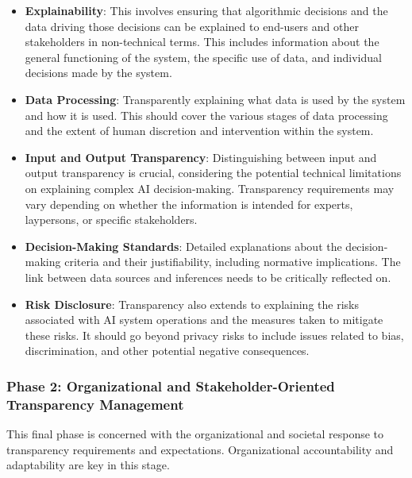 \documentclass{article}
\begin{document}
\begin{itemize}

    \item \textbf{Explainability}: This involves ensuring that algorithmic decisions and the data driving those decisions can be explained to end-users and other stakeholders in non-technical terms. This includes information about the general functioning of the system, the specific use of data, and individual decisions made by the system.
    
    \item \textbf{Data Processing}: Transparently explaining what data is used by the system and how it is used. This should cover the various stages of data processing and the extent of human discretion and intervention within the system.
    
    \item \textbf{Input and Output Transparency}: Distinguishing between input and output transparency is crucial, considering the potential technical limitations on explaining complex AI decision-making. Transparency requirements may vary depending on whether the information is intended for experts, laypersons, or specific stakeholders.
    
    \item \textbf{Decision-Making Standards}: Detailed explanations about the decision-making criteria and their justifiability, including normative implications. The link between data sources and inferences needs to be critically reflected on.
    
    \item \textbf{Risk Disclosure}: Transparency also extends to explaining the risks associated with AI system operations and the measures taken to mitigate these risks. It should go beyond privacy risks to include issues related to bias, discrimination, and other potential negative consequences.

\end{itemize}

\subsubsection{Phase 2: Organizational and Stakeholder-Oriented Transparency Management}

This final phase is concerned with the organizational and societal response to transparency requirements and expectations. Organizational accountability and adaptability are key in this stage.
\end{document}
